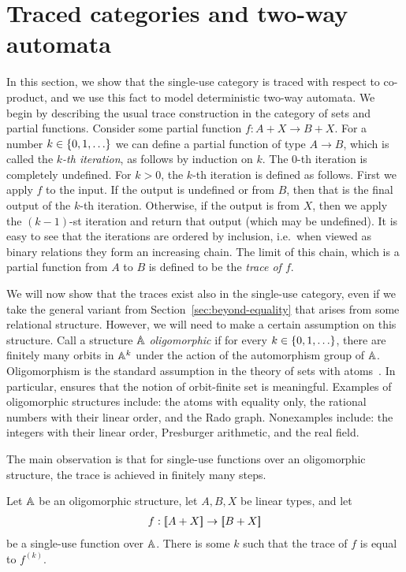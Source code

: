 \section{Traced categories and two-way automata}
\label{sec:two-way-automata}

In this section, we show that the single-use category is traced with respect to co-product, and we use this fact to model deterministic two-way automata.
We begin by describing the usual trace construction in the category of sets and partial functions. 
Consider some partial function $
f : A + X \to B + X.$
For a number $k \in \{0,1,\ldots\}$ we can define a partial function of type $A \to B$, which is called the \emph{$k$-th iteration}, as  follows by induction on $k$. The $0$-th iteration is  completely undefined. For $k > 0$, the $k$-th iteration is defined as follows. First we apply $f$ to the input. If the output is undefined or from  $B$, then that is the final output of the $k$-th iteration. Otherwise, if the output is from $X$, then we apply the $(k-1)$-st iteration and return that output (which may be undefined). It is easy to see that the iterations are ordered by inclusion, i.e.~when viewed as binary relations they form an increasing chain. The limit of this chain, which is a partial function from $A$ to $B$ is defined to be the \emph{trace of $f$}. 

We will now show that the traces exist also in the single-use category, even if we take the general variant from Section~\ref{sec:beyond-equality} that arises from some relational structure. However, we will need to make a certain assumption on this structure. Call a structure $\mathbb A$  \emph{oligomorphic} if for every $k \in \{0,1,\ldots\}$, there  are finitely many orbits in $\mathbb A^k$ under the action of the automorphism group of $\mathbb A$.
Oligomorphism is the standard assumption in the theory of sets with atoms~\cite{bojanczyk_slightly2018}. In particular, ensures that the notion of orbit-finite set is meaningful. Examples of oligomorphic structures include: the atoms with equality only, the rational numbers with their linear order, and the Rado graph. Nonexamples include: the integers with their linear order, Presburger arithmetic, and the real field. 



The main observation is that for single-use functions over an oligomorphic structure, the trace is achieved in finitely many steps.
\begin{lemma}\label{lem:traced-finite-iteration} Let $\mathbb A$ be an oligomorphic structure, let $A,B,X$ be linear types, and let 
    \begin{align*}
        f : [{\kern-0.45ex}[A + X]{\kern-0.45ex}] \to [{\kern-0.45ex}[B + X]{\kern-0.45ex}]
        \end{align*}
        be a single-use function over $\mathbb A$. There is some $k$ such that the trace of $f$ is equal to $f^{(k)}$.
\end{lemma}



